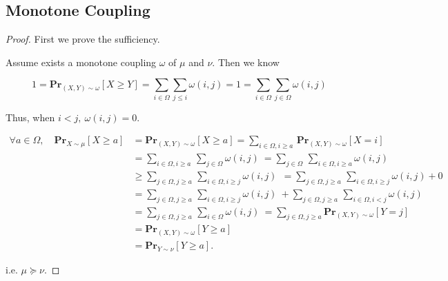 \documentclass{article}
\begin{document}
\subsection{Monotone Coupling}
\vspace{1em}
\begin{proof}
    First we prove the sufficiency.
    
    \hspace{1.3em}
    Assume exists a monotone coupling $\omega$ of $\mu$ and $\nu$. Then we know 
    
    \vspace{-1.5em}
    $$1 = \mathbf{Pr}_{(X,Y)\sim\omega}\left[X\geq Y\right] = \sum_{i\in\Omega} \sum_{j\le i}\omega(i,j) = 1 = \sum_{i\in\Omega}\sum_{j\in\Omega}\omega(i,j)$$
    
    \vspace{-1em} \hspace{1.3em}
    Thus, when $i<j,\ \omega(i,j)=0.$
    
    \vspace{-3em}
    \begin{align*}
        \forall a\in \Omega,\quad \mathbf{Pr}_{X\sim\mu}\left[X\geq a\right] &= \mathbf{Pr}_{(X,Y)\sim\omega}\left[X\geq a\right] = \sum_{i\in\Omega, i\geq a\ }\mathbf{Pr}_{(X,Y)\sim\omega}\left[X=i\right] \quad \\
        &= \sum_{i\in\Omega, i\geq a\ }\sum_{j\in\Omega}\omega(i,j) 
        \ = \sum_{j\in\Omega\ } \sum_{i\in\Omega, i\geq a} \omega(i,j) \\
        &\geq \sum_{j\in\Omega, j\geq a\ } \sum_{i\in\Omega, i\geq j} \omega(i,j) \ \ = \sum_{j\in\Omega, j\geq a\ } \sum_{i\in\Omega, i\geq j} \omega(i,j) + 0\\
        & = \sum_{j\in\Omega, j\geq a\ } \sum_{i\in\Omega, i\geq j} \omega(i,j)\ + \sum_{j\in\Omega, j\geq a\ } \sum_{i\in\Omega, i<j} \omega(i,j) \\
        &= \sum_{j\in\Omega, j\geq a\ } \sum_{i\in\Omega} \omega(i,j)\  = \sum_{j\in\Omega, j\geq a} \mathbf{Pr}_{(X,Y)\sim\omega}\left[Y=j\right] \\
        &= \mathbf{Pr}_{(X,Y)\sim\omega}\left[Y\geq a\right] \\
        &= \mathbf{Pr}_{Y\sim\nu}\left[Y\geq a\right].
    \end{align*}

    \vspace{-1em} \hspace{1.3em}
    i.e. \qquad $\mu\succeq\nu.$
    

\end{proof}
\end{document}
